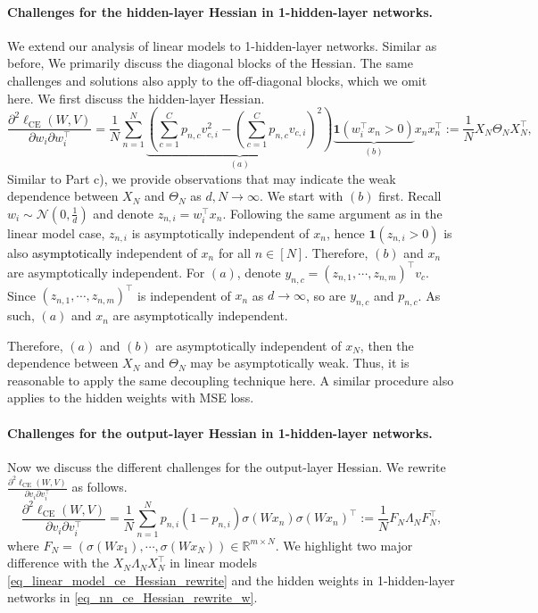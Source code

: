 \documentclass{article}
\newcommand{\rw}{\rightarrow}
\newcommand{\1}{^{(1)}}
\newcommand{\2}{^{(2)}}
\newcommand{\zhaoruirevise}[1]{\textcolor{black}{ #1}}
\begin{document}
\paragraph{Challenges for the hidden-layer Hessian in 1-hidden-layer networks.} We extend our analysis of linear models to 1-hidden-layer networks. Similar as before, We primarily discuss the diagonal blocks of the Hessian.  The same challenges and solutions also apply to the off-diagonal blocks, which we omit here. We first discuss the hidden-layer Hessian. 
\begin{equation}
\label{eq_nn_ce_Hessian_rewrite_w}
  \frac{\partial^2\ell_{\text{CE}}(W,V)}{\partial w_i  \partial w_i^\top} = \frac{1}{N}\sum_{n= 1}^N  \underbrace{\left(\sum_{c=  1}^C p_{n,c} v_{c,i}^2 - \left(\sum_{c=1}^C p_{n,c} v_{c,i}\right)^2\right)}_{(a)}   \underbrace{\mathbf{1}(w_i^\top x_n >0)}_{(b)} x_n x_n^\top := \frac{1}{N} X_N \Theta_N X_N^\top, 
\end{equation}
Similar to Part c), we provide observations that may indicate the weak dependence between $X_N$ and $\Theta_N$ as $d,N\rw\infty$. 
We start with $(b)$ first. Recall $w_i \sim \mathcal{N}(0,\frac{1}{d})$ and denote  $z_{n,i} = w_i^\top x_n$. Following the same argument as in the linear model case, $z_{n,i}$ is asymptotically independent of $x_n$, hence $\mathbf{1} (z_{n,i}>0)$ is also \zhaoruirevise{asymptotically} independent of $x_n$ for all $n \in [N]$. Therefore,  $(b)$ and $x_n$ are asymptotically independent. For $(a)$, denote $y_{n,c} = (z_{n,1}, \cdots, z_{n,m})^\top v_c$. Since $(z_{n,1}, \cdots, z_{n,m})^\top$ is independent of $x_n$ as $d\rightarrow \infty$, so are $y_{n,c}$ and $p_{n,c}$. As such, $(a)$ and $x_n$ are asymptotically independent.  

Therefore, $(a)$ and $(b)$ are asymptotically independent of $x_N$, then the dependence between $X_N$ and $\Theta_N$ may be asymptotically weak.  Thus, it is reasonable to apply the same decoupling technique here. A similar procedure also applies to the hidden weights with MSE loss.  








\paragraph{Challenges for the output-layer Hessian in 1-hidden-layer networks.} 
Now we discuss the different challenges for the output-layer Hessian. We rewrite  $\frac{\partial^2\ell_{\text{CE}}(W,V)}{\partial v_i  \partial v_i^\top}$ as follows. 
\begin{equation}
\label{eq_nn_ce_Hessian_rewrite_v}
  \frac{\partial^2\ell_{\text{CE}}(W,V)}{\partial v_i  \partial v_i^\top} = \frac{1}{N} \sum_{n= 1}^N  p_{n,i} (1-p_{n,i}) \sigma(Wx_n) \sigma(Wx_n)^\top  := \frac{1}{N} F_N \Lambda_N F_N^\top, 
\end{equation}
where $F_N = (\sigma(Wx_1), \cdots, \sigma(Wx_N)) \in \mathbb{R}^{m\times N}$. 
We highlight two major difference with the $X_N \Lambda_N X_N^\top$ in linear models \eqref{eq_linear_model_ce_Hessian_rewrite} and the hidden weights in 1-hidden-layer networks in \eqref{eq_nn_ce_Hessian_rewrite_w}.
\end{document}
